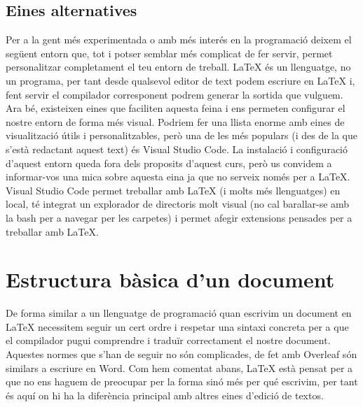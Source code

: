 \documentclass[12pm,twosides,onecolumn,openany]{book}
\begin{document}
\subsection{Eines alternatives}
Per a la gent més experimentada o amb més interés en la programació deixem el següent entorn que, tot i potser semblar més complicat de fer servir, permet personalitzar completament el teu entorn de treball. LaTeX és un llenguatge, no un programa, per tant desde qualsevol editor de text podem escriure en LaTeX i, fent servir el compilador corresponent podrem generar la sortida que vulguem. Ara bé, existeixen eines que faciliten aquesta feina i ens permeten configurar el nostre entorn de forma més visual. Podriem fer una llista enorme amb eines de visualització útils i personalitzables, però una de les més populars (i des de la que s'està redactant aquest text) és Visual Studio Code. La instalació i configuració d'aquest entorn queda fora dels proposits d'aquest curs, però us convidem a informar-vos una mica sobre aquesta eina ja que no serveix només per a LaTeX. Visual Studio Code permet treballar amb LaTeX (i molts més llenguatges) en local, té integrat un explorador de directoris molt visual (no cal barallar-se amb la bash per a navegar per les carpetes) i permet afegir extensions pensades per a treballar amb LaTeX.
\section{Estructura bàsica d'un document}
De forma similar a un llenguatge de programació quan escrivim un document en LaTeX necessitem seguir un cert ordre i respetar una sintaxi concreta per a que el compilador pugui comprendre i traduïr correctament el nostre document. Aquestes normes que s'han de seguir no són complicades, de fet amb Overleaf són similars a escriure en Word. Com hem comentat abans, LaTeX està pensat per a que no ens haguem de preocupar per la forma sinó més per qué escrivim, per tant és aquí on hi ha la diferència principal amb altres eines d'edició de textos. 
\end{document}
